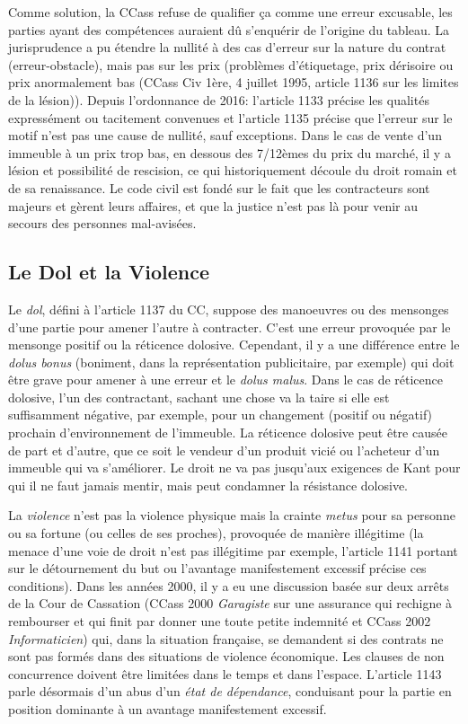 \documentclass[math]{cours}
\begin{document}
Comme solution, la CCass refuse de qualifier ça comme une erreur excusable, les parties ayant des compétences auraient dû s'enquérir de l'origine du tableau.
La jurisprudence a pu étendre la nullité à des cas d'erreur sur la nature du contrat (erreur-obstacle), mais pas sur les prix (problèmes d'étiquetage, prix dérisoire ou prix anormalement bas (CCass Civ 1ère, 4 juillet 1995, article 1136 sur les limites de la lésion)).
Depuis l'ordonnance de 2016: l'article 1133 précise les qualités expressément ou tacitement convenues et l'article 1135 précise que l'erreur sur le motif n'est pas une cause de nullité, sauf exceptions.
Dans le cas de vente d'un immeuble à un prix trop bas, en dessous des 7/12èmes du prix du marché, il y a lésion et possibilité de rescision, ce qui historiquement découle du droit romain et de sa renaissance.
Le code civil est fondé sur le fait que les contracteurs sont majeurs et gèrent leurs affaires, et que la justice n'est pas là pour venir au secours des personnes mal-avisées.

\subsection{Le Dol et la Violence}
Le \emph{dol}, défini à l'article 1137 du CC, suppose des manoeuvres ou des mensonges d'une partie pour amener l'autre à contracter.
C'est une erreur provoquée par le mensonge positif ou la réticence dolosive.
Cependant, il y a une différence entre le \emph{dolus bonus} (boniment, dans la représentation publicitaire, par exemple) qui doit être grave pour amener à une erreur et le \emph{dolus malus}.
Dans le cas de réticence dolosive, l'un des contractant, sachant une chose va la taire si elle est suffisamment négative, par exemple, pour un changement (positif ou négatif) prochain d'environnement de l'immeuble.
La réticence dolosive peut être causée de part et d'autre, que ce soit le vendeur d'un produit vicié ou l'acheteur d'un immeuble qui va s'améliorer.
Le droit ne va pas jusqu'aux exigences de Kant pour qui il ne faut jamais mentir, mais peut condamner la résistance dolosive.

La \emph{violence} n'est pas la violence physique mais la crainte \emph{metus} pour sa personne ou sa fortune (ou celles de ses proches), provoquée de manière illégitime (la menace d'une voie de droit n'est pas illégitime par exemple, l'article 1141 portant sur le détournement du but ou l'avantage manifestement excessif précise ces conditions).
Dans les années 2000, il y a eu une discussion basée sur deux arrêts de la Cour de Cassation (CCass 2000 \emph{Garagiste} sur une assurance qui rechigne à rembourser et qui finit par donner une toute petite indemnité et CCass 2002 \emph{Informaticien}) qui, dans la situation française, se demandent si des contrats ne sont pas formés dans des situations de violence économique.
Les clauses de non concurrence doivent être limitées dans le temps et dans l'espace. L'article 1143 parle désormais d'un abus d'un \emph{état de dépendance}, conduisant pour la partie en position dominante à un avantage manifestement excessif.
\end{document}
